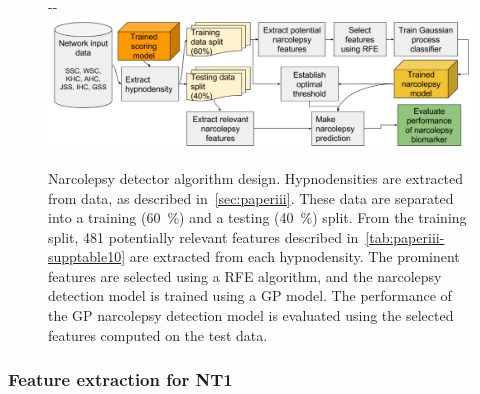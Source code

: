 \begin{figure}
    \begin{adjustwidth*}{}{-\marginparwidth-\marginparsep}
        \includegraphics[width=\textwidth+\marginparwidth+\marginparsep]{figures/paper-iii/Figure_5c.png}
        \caption[Narcolepsy detector algorithm design]{Narcolepsy detector algorithm design. Hypnodensities are extracted from data, as described in~\cref{sec:paperiii}. 
        These data are separated into a training (\SI{60}{\percent}) and a testing (\SI{40}{\percent}) split. 
        From the training split, 481 potentially relevant features described in~\cref{tab:paperiii-supptable10} are extracted from each hypnodensity. 
        The prominent features are selected using a \ac{RFE} algorithm, and the narcolepsy detection model is trained using a \ac{GP} model.
        The performance of the \ac{GP} narcolepsy detection  model is evaluated using the selected features computed on the test data.}
        \label{fig:paperiii-figure5c}
    \end{adjustwidth*}
\end{figure}

\subsubsection{Feature extraction for \ac{NT1}}

